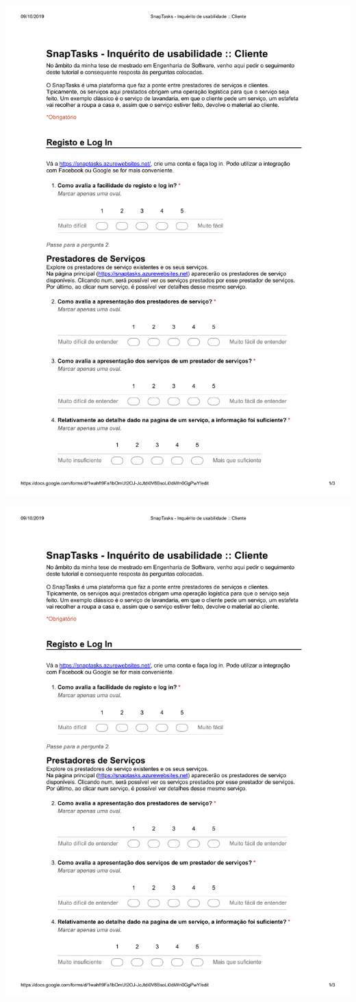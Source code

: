 \includegraphics[page=2,origin=c, width=\textwidth ]{appendices/files/inquiry-customer.pdf}
\pagebreak

\includegraphics[page=3,origin=c, width=\textwidth ]{appendices/files/inquiry-customer.pdf}

